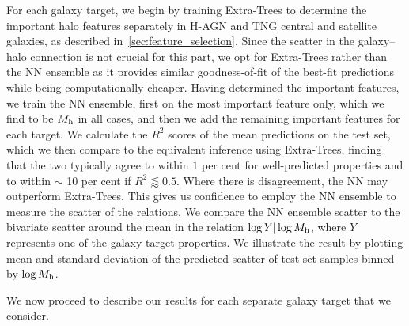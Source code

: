 \documentclass[usenatbib,useAMS]{mnras}
\begin{document}
For each galaxy target, we begin by training Extra-Trees to determine the important halo features separately in H-AGN and TNG central and satellite galaxies, as described in~\cref{sec:feature_selection}. Since the scatter in the galaxy--halo connection is not crucial for this part, we opt for Extra-Trees rather than the NN ensemble as it provides similar goodness-of-fit of the best-fit predictions while being computationally cheaper. Having determined the important features, we train the NN ensemble, first on the most important feature only, which we find to be $M_{\rm h}$ in all cases, and then we add the remaining important features for each target. We calculate the $R^2$ scores of the mean predictions on the test set, which we then compare to the equivalent inference using Extra-Trees, finding that the two typically agree to within $1$ per cent for well-predicted properties and to within $\sim$ 10 per cent if $R^2 \lessapprox 0.5$. Where there is disagreement, the \ac{NN} may outperform Extra-Trees.
This gives us confidence to employ the \ac{NN} ensemble to measure the scatter of the relations. We compare the \ac{NN} ensemble scatter to the bivariate scatter around the mean in the relation $\log Y | \log M_{\rm h}$, where $Y$ represents one of the galaxy target properties. We illustrate the result by plotting mean and standard deviation of the predicted scatter of test set samples binned by $\log M_{\rm h}$.

We now proceed to describe our results for each separate galaxy target that we consider.
\end{document}
